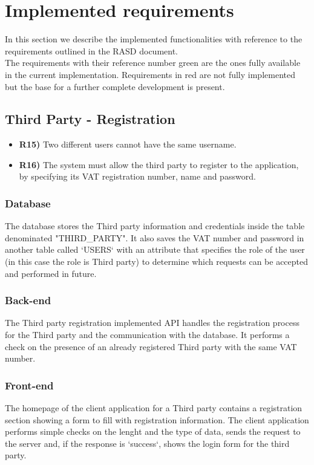 \section{Implemented requirements}

In this section we describe the implemented functionalities with reference to the requirements outlined in the RASD document.\\
The requirements with their reference number green are the ones fully available in the current implementation. 
Requirements in red are not fully implemented but the base for a further complete development is present.

\subsection{Third Party - Registration}
\begin{itemize}
	\item {\color{Green}\textbf{R15)}} Two different users cannot have the same username.
	\item {\color{Green}\textbf{R16)}} The system must allow the third party to register to the application, by specifying its VAT registration number, name and password.
\end{itemize}

\subsubsection*{Database}
The database stores the Third party information and credentials inside the table denominated "THIRD\_PARTY". It also saves the VAT number and password in another table called `USERS` with an attribute that specifies the role of the user (in this case the role is Third party) to determine which requests can be accepted and performed in future.\\

\subsubsection*{Back-end}
The Third party registration implemented API handles the registration process for the Third party and the communication with the database. It performs a check on the presence of an already registered Third party with the same VAT number.

\subsubsection*{Front-end}
The homepage of the client application for a Third party contains a registration section showing a form to fill with registration information. The client application performs simple checks on the lenght and the type of data, sends the request to the server and, if the response is `success`,  shows the login form for the third party.


